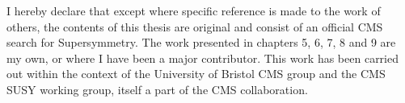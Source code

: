 
\begin{declaration}
I hereby declare that except where specific reference is made to the work of 
others, the contents of this thesis are original and consist of an official CMS
search for Supersymmetry. The work presented in chapters 5, 6, 7, 8 and 9 are
my own, or where I have been a major contributor. This work has been carried
out within the context of the University of Bristol CMS group and the
CMS SUSY working group, itself a part of the CMS collaboration.
\end{declaration}

